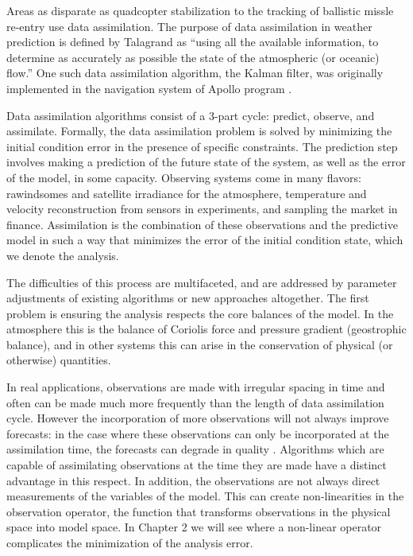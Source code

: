 \documentclass[12pt]{report}
\begin{document}
Areas as disparate as quadcopter stabilization  to the tracking of ballistic missle re-entry  use data assimilation.
The purpose of data assimilation in weather prediction is defined by Talagrand as ``using all the available information, to determine as accurately as possible the state of the atmospheric (or oceanic) flow.'' 
One such data assimilation algorithm, the Kalman filter, was originally implemented in the navigation system of Apollo program .

Data assimilation algorithms consist of a 3-part cycle: predict, observe, and assimilate.
Formally, the data assimilation problem is solved by minimizing the initial condition error in the presence of specific constraints.
The prediction step involves making a prediction of the future state of the system, as well as the error of the model, in some capacity.
Observing systems come in many flavors: rawindsomes and satellite irradiance for the atmosphere, temperature and velocity reconstruction from sensors in experiments, and sampling the market in finance.
Assimilation is the combination of these observations and the predictive model in such a way that minimizes the error of the initial condition state, which we denote the analysis.

The difficulties of this process are multifaceted, and are addressed by parameter adjustments of existing algorithms or new approaches altogether.
The first problem is ensuring the analysis respects the core balances of the model.
In the atmosphere this is the balance of Coriolis force and pressure gradient (geostrophic balance), and in other systems this can arise in the conservation of physical (or otherwise) quantities.

In real applications, observations are made with irregular spacing in time and often can be made much more frequently than the length of data assimilation cycle.
However the incorporation of more observations will not always improve forecasts: in the case where these observations can only be incorporated at the assimilation time, the forecasts can degrade in quality .
Algorithms which are capable of assimilating observations at the time they are made have a distinct advantage in this respect.
In addition, the observations are not always direct measurements of the variables of the model. 
This can create non-linearities in the observation operator, the function that transforms observations in the physical space into model space.
In Chapter 2 we will see where a non-linear operator complicates the minimization of the analysis error.
\end{document}
